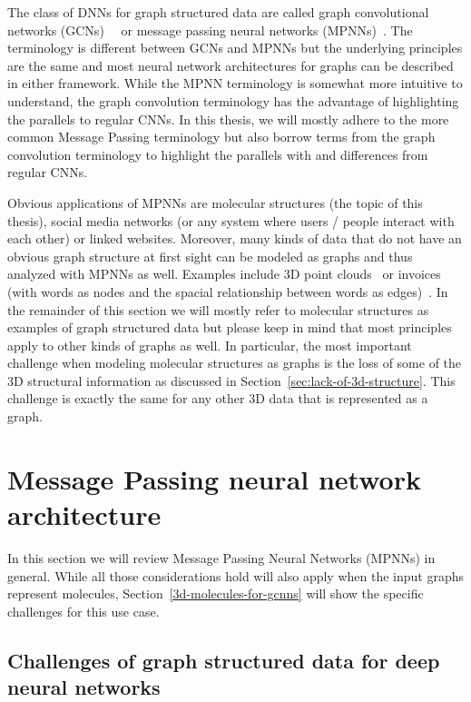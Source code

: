 The class of DNNs for graph structured data are called graph convolutional networks (GCNs)~\cite{Kipf2017}~\cite{Schutt2017} or message passing neural networks (MPNNs)~\cite{Gilmer2017}. The terminology is different between GCNs and MPNNs but the underlying principles are the same and most neural network architectures for graphs can be described in either framework. While the MPNN terminology is somewhat more intuitive to understand, the graph convolution terminology has the advantage of highlighting the parallels to regular CNNs. In this thesis, we will mostly adhere to the more common Message Passing terminology but also borrow terms from the graph convolution terminology to highlight the parallels with and differences from regular CNNs.

Obvious applications of MPNNs are molecular structures (the topic of this thesis), social media networks (or any system where users / people interact with each other) or linked websites. Moreover, many kinds of data that do not have an obvious graph structure at first sight can be modeled as graphs and thus analyzed with MPNNs as well. Examples include 3D point clouds~\cite{Charles2017} or invoices (with words as nodes and the spacial relationship between words as edges)~\cite{Riba2019}.
In the remainder of this section we will mostly refer to molecular structures as examples of graph structured data but please keep in mind that most principles apply to other kinds of graphs as well. In particular, the most important challenge when modeling molecular structures as graphs is the loss of some of the 3D structural information as discussed in Section~\ref{sec:lack-of-3d-structure}. This challenge is exactly the same for any other 3D data that is represented as a graph.

\section{Message Passing neural network architecture}

In this section we will review Message Passing Neural Networks (MPNNs) in general. While all those considerations hold will also apply when the input graphs represent molecules, Section~\ref{3d-molecules-for-gcnns} will show the specific challenges for this use case.

\subsection{Challenges of graph structured data for deep neural networks}
\label{sec:graph-challenges}

